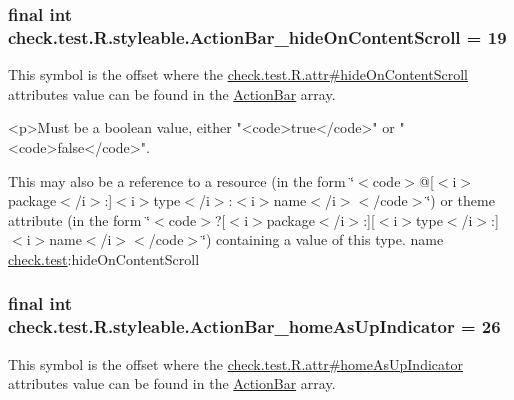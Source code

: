 \subsubsection[{Action\+Bar\+\_\+hide\+On\+Content\+Scroll}]{\setlength{\rightskip}{0pt plus 5cm}final int check.\+test.\+R.\+styleable.\+Action\+Bar\+\_\+hide\+On\+Content\+Scroll = 19\hspace{0.3cm}{\ttfamily [static]}}\label{classcheck_1_1test_1_1_r_1_1styleable_a62a234e7f0069b54f7bc50a087a598a6}
This symbol is the offset where the \hyperlink{classcheck_1_1test_1_1_r_1_1attr_ae2d6e7290f2cd4974b305b03b1f5f329}{check.\+test.\+R.\+attr\#hide\+On\+Content\+Scroll} attribute\textquotesingle{}s value can be found in the \hyperlink{classcheck_1_1test_1_1_r_1_1styleable_ad0a4d403cb244ea4d22c6f6ebf2c2cdf}{Action\+Bar} array.

\begin{DoxyVerb}      <p>Must be a boolean value, either "<code>true</code>" or "<code>false</code>".
\end{DoxyVerb}
 

This may also be a reference to a resource (in the form \char`\"{}$<$code$>$@\mbox{[}$<$i$>$package$<$/i$>$\+:\mbox{]}$<$i$>$type$<$/i$>$\+:$<$i$>$name$<$/i$>$$<$/code$>$\char`\"{}) or theme attribute (in the form \char`\"{}$<$code$>$?\mbox{[}$<$i$>$package$<$/i$>$\+:\mbox{]}\mbox{[}$<$i$>$type$<$/i$>$\+:\mbox{]}$<$i$>$name$<$/i$>$$<$/code$>$\char`\"{}) containing a value of this type.  name \hyperlink{namespacecheck_1_1test}{check.\+test}\+:hide\+On\+Content\+Scroll \hypertarget{classcheck_1_1test_1_1_r_1_1styleable_a84fd3d85c1d60971f8574c3b4809433a}{}
\subsubsection[{Action\+Bar\+\_\+home\+As\+Up\+Indicator}]{\setlength{\rightskip}{0pt plus 5cm}final int check.\+test.\+R.\+styleable.\+Action\+Bar\+\_\+home\+As\+Up\+Indicator = 26\hspace{0.3cm}{\ttfamily [static]}}\label{classcheck_1_1test_1_1_r_1_1styleable_a84fd3d85c1d60971f8574c3b4809433a}
This symbol is the offset where the \hyperlink{classcheck_1_1test_1_1_r_1_1attr_a337a62ef9d44c64d88a4136aca1a5d52}{check.\+test.\+R.\+attr\#home\+As\+Up\+Indicator} attribute\textquotesingle{}s value can be found in the \hyperlink{classcheck_1_1test_1_1_r_1_1styleable_ad0a4d403cb244ea4d22c6f6ebf2c2cdf}{Action\+Bar} array.

